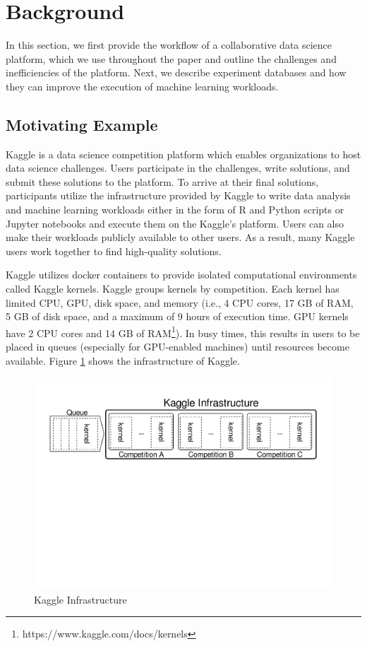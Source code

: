 \section{Background} \label{sec-background}
In this section, we first provide the workflow of a collaborative data science platform, which we use throughout the paper and outline the challenges and inefficiencies of the platform.
Next, we describe experiment databases and how they can improve the execution of machine learning workloads.

\subsection{Motivating Example}\label{subsec-motivational-example}
Kaggle is a data science competition platform which enables organizations to host data science challenges.
Users participate in the challenges, write solutions, and submit these solutions to the platform.
To arrive at their final solutions, participants utilize the infrastructure provided by Kaggle to write data analysis and machine learning workloads either in the form of R and Python scripts or Jupyter notebooks and execute them on the Kaggle's platform.
Users can also make their workloads publicly available to other users.
As a result, many Kaggle users work together to find high-quality solutions.

Kaggle utilizes docker containers to provide isolated computational environments called Kaggle kernels.
Kaggle groups kernels by competition.
Each kernel has limited CPU, GPU, disk space, and memory (i.e., 4 CPU cores, 17 GB of RAM, 5 GB of disk space, and a maximum of 9 hours of execution time. GPU kernels have 2 CPU cores and 14 GB of RAM\footnote{https://www.kaggle.com/docs/kernels}).
In busy times, this results in users to be placed in queues (especially for GPU-enabled machines) until resources become available.
Figure \ref{example-use-case} shows the infrastructure of Kaggle.

\begin{figure}
\centering
\includegraphics[width=\columnwidth]{../images/example-use-case}
\caption{Kaggle Infrastructure}
\label{example-use-case}
\end{figure}

